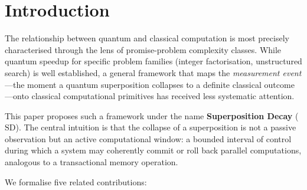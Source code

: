 \documentclass[11pt]{article}
\theoremstyle{plain}
\theoremstyle{definition}
\theoremstyle{remark}
\newcommand{\SD}{\ensuremath{\mathrm{SD}}}   %
\begin{document}
\tableofcontents
\newpage

\section{Introduction}
\label{sec:intro}

The relationship between quantum and classical computation is most precisely
characterised through the lens of promise-problem complexity classes.
While quantum speedup for specific problem families (integer factorisation,
unstructured search) is well established, a general framework that maps the
\emph{measurement event}---the moment a quantum superposition collapses to a
definite classical outcome---onto classical computational primitives has
received less systematic attention.

This paper proposes such a framework under the name \textbf{Superposition
Decay} (\SD).  The central intuition is that the collapse of a superposition
is not a passive observation but an active computational window: a bounded
interval of control during which a system may coherently commit or roll back
parallel computations, analogous to a transactional memory operation.

We formalise five related contributions:
\end{document}
